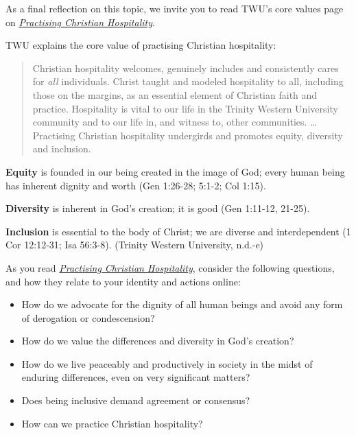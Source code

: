\documentclass[
  letterpaper,
  DIV=11,
  numbers=noendperiod]{scrreprt}
\providecommand{\tightlist}{%
  \setlength{\itemsep}{0pt}\setlength{\parskip}{0pt}}\usepackage{longtable,booktabs,array}
\begin{document}
\begin{tcolorbox}[enhanced jigsaw, toprule=.15mm, colback=white, colframe=quarto-callout-note-color-frame, bottomtitle=1mm, leftrule=.75mm, coltitle=black, titlerule=0mm, rightrule=.15mm, colbacktitle=quarto-callout-note-color!10!white, left=2mm, title={Learning Activity}, opacitybacktitle=0.6, opacityback=0, breakable, toptitle=1mm, arc=.35mm, bottomrule=.15mm]

As a final reflection on this topic, we invite you to read TWU's core
values page on
\href{https://www.twu.ca/about-us/commitments/core-values/practising-christian-hospitality}{\emph{Practising
Christian Hospitality}}.

TWU explains the core value of practising Christian hospitality:

\begin{quote}
Christian hospitality welcomes, genuinely includes and consistently
cares for \emph{all} individuals. Christ taught and modeled hospitality
to all, including those on the margins, as an essential element of
Christian faith and practice. Hospitality is vital to our life in the
Trinity Western University community and to our life in, and witness to,
other communities. \ldots{} Practising Christian hospitality undergirds
and promotes equity, diversity and inclusion.
\end{quote}

\textbf{Equity} is founded in our being created in the image of God;
every human being has inherent dignity and worth (Gen 1:26-28; 5:1-2;
Col 1:15).

\textbf{Diversity} is inherent in God's creation; it is good (Gen
1:11-12, 21-25).

\textbf{Inclusion} is essential to the body of Christ; we are diverse
and interdependent (1 Cor 12:12-31; Isa 56:3-8). (Trinity Western
University, n.d.-e)

As you read
\href{https://www.twu.ca/about-us/commitments/core-values/practising-christian-hospitality}{\emph{Practising
Christian Hospitality}}, consider the following questions, and how they
relate to your identity and actions online:

\begin{itemize}
\tightlist
\item
  How do we advocate for the dignity of all human beings and avoid any
  form of derogation or condescension?
\item
  How do we value the differences and diversity in God's creation?
\item
  How do we live peaceably and productively in society in the midst of
  enduring differences, even on very significant matters?
\item
  Does being inclusive demand agreement or consensus?
\item
  How can we practice Christian hospitality?
\end{itemize}

\end{tcolorbox}
\end{document}
